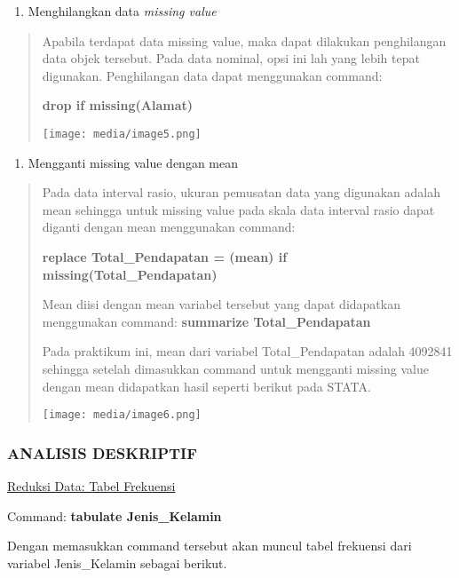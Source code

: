 \documentclass[
]{article}
\begin{document}
\begin{enumerate}
\def\labelenumi{\arabic{enumi}.}
\setcounter{enumi}{1}
\item
  Menghilangkan data \emph{missing value}
\end{enumerate}

\begin{quote}
Apabila terdapat data missing value, maka dapat dilakukan penghilangan
data objek tersebut. Pada data nominal, opsi ini lah yang lebih tepat
digunakan. Penghilangan data dapat menggunakan command:

\textbf{drop if missing(Alamat)}

\texttt{[image: media/image5.png]}
\end{quote}

\begin{enumerate}
\def\labelenumi{\arabic{enumi}.}
\setcounter{enumi}{2}
\item
  Mengganti missing value dengan mean
\end{enumerate}

\begin{quote}
Pada data interval rasio, ukuran pemusatan data yang digunakan adalah
mean sehingga untuk missing value pada skala data interval rasio dapat
diganti dengan mean menggunakan command:

\textbf{replace Total\_Pendapatan = (mean) if
missing(Total\_Pendapatan)}

Mean diisi dengan mean variabel tersebut yang dapat didapatkan
menggunakan command: \textbf{summarize Total\_Pendapatan}

Pada praktikum ini, mean dari variabel Total\_Pendapatan adalah 4092841
sehingga setelah dimasukkan command untuk mengganti missing value dengan
mean didapatkan hasil seperti berikut pada STATA.

\texttt{[image: media/image6.png]}
\end{quote}

\hypertarget{analisis-deskriptif-1}{%
\subsubsection{ANALISIS DESKRIPTIF}\label{analisis-deskriptif-1}}

\uline{Reduksi Data: Tabel Frekuensi}

Command: \textbf{tabulate Jenis\_Kelamin}

Dengan memasukkan command tersebut akan muncul tabel frekuensi dari
variabel Jenis\_Kelamin sebagai berikut.
\end{document}
